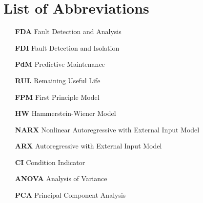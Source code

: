 \chapter*{List of Abbreviations}
\label{chap:abb}

\begin{itemize}[leftmargin=2.7cm]
	\item[\textbf{FDA}] Fault Detection and Analysis
	\item[\textbf{FDI}] Fault Detection and Isolation
	\item[\textbf{PdM}] Predictive Maintenance
	\item[\textbf{RUL}] Remaining Useful Life
	\item[\textbf{FPM}] First Principle Model
	\item[\textbf{HW}] Hammerstein-Wiener Model
	\item[\textbf{NARX}] Nonlinear Autoregressive with External Input Model
	\item[\textbf{ARX}]  Autoregressive with External Input Model
	\item[\textbf{CI}] Condition Indicator
	\item[\textbf{ANOVA}] Analysis of Variance
	\item[\textbf{PCA}] Principal Component Analysis
	
\end{itemize}
